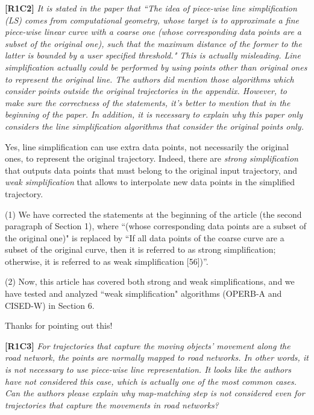 \documentclass{letter}
\begin{document}
\textbf{[R1C2]} \emph{It is stated in the paper that ``The idea of piece-wise line simplification (LS) comes from computational geometry, whose target is to approximate a fine piece-wise linear curve with a coarse one (whose corresponding data points are a subset of the original one), such that the maximum distance of the former to the latter is bounded by a user specified threshold." This is actually misleading. Line simplification actually could be performed by using points other than original ones to represent the original line. The authors did mention those algorithms which consider points outside the original trajectories in the appendix. However, to make sure the correctness of the statements, it's better to mention that in the beginning of the paper. In addition, it is necessary to explain why this paper only considers the line simplification algorithms that consider the original points only. }

Yes, line simplification can use extra data points, not necessarily the original ones, to represent the original trajectory. Indeed, there are \emph{strong simplification} that outputs data points that must belong to the original input trajectory, and \emph{weak simplification} that allows to interpolate new data points in the simplified trajectory.

(1) We have corrected the statements at the beginning of the article (the second paragraph of Section 1), where ``(whose corresponding data points are a subset of the original one)" is replaced by ``If all data points of the coarse curve are a
subset of the original curve, then it is referred to as strong simplification; otherwise, it is referred to
as weak simplification [56])''.

(2) Now, this article has covered both strong and weak simplifications, and we have tested and analyzed ``weak simplification" algorithms (OPERB-A and CISED-W) in Section 6.

Thanks for pointing out this!

\textbf{[R1C3]} \emph{For trajectories that capture the moving objects' movement along the road network, the points are normally mapped to road networks. In other words, it is not necessary to use piece-wise line representation. It looks like the authors have not considered this case, which is actually one of the most common cases. Can the authors please explain why map-matching step is not considered even for trajectories that capture the movements in road networks?}
\end{document}
